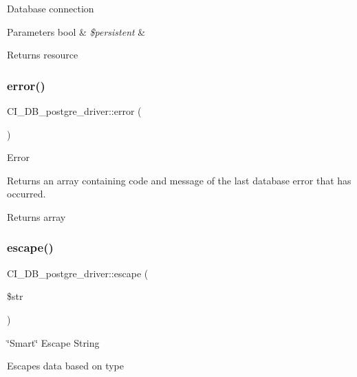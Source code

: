 Database connection


\begin{DoxyParams}[1]{Parameters}
bool & {\em \$persistent} & \\
\hline
\end{DoxyParams}
\begin{DoxyReturn}{Returns}
resource 
\end{DoxyReturn}
\mbox{\label{class_c_i___d_b__postgre__driver_a6b9e87c5af0bcc3b012dad708b611d1b}} 
\subsubsection{\texorpdfstring{error()}{error()}}
{\footnotesize\ttfamily C\+I\+\_\+\+D\+B\+\_\+postgre\+\_\+driver\+::error (\begin{DoxyParamCaption}{ }\end{DoxyParamCaption})}

Error

Returns an array containing code and message of the last database error that has occurred.

\begin{DoxyReturn}{Returns}
array 
\end{DoxyReturn}
\mbox{\label{class_c_i___d_b__postgre__driver_a1877cca54c45c21d61e06d59354eea45}} 
\subsubsection{\texorpdfstring{escape()}{escape()}}
{\footnotesize\ttfamily C\+I\+\_\+\+D\+B\+\_\+postgre\+\_\+driver\+::escape (\begin{DoxyParamCaption}\item[{}]{\$str }\end{DoxyParamCaption})}

\char`\"{}\+Smart\char`\"{} Escape String

Escapes data based on type



